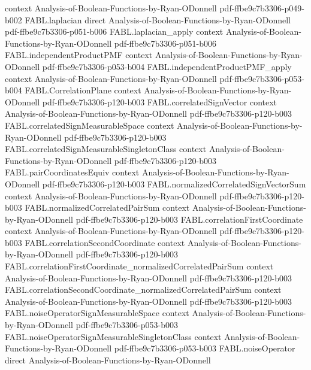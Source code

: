 \begin{theorem}
  {context}
  {Analysis-of-Boolean-Functions-by-Ryan-ODonnell}
  {pdf-ffbe9c7b3306-p049-b002}
\proofstep
  {FABL.laplacian}
  {direct}
  {Analysis-of-Boolean-Functions-by-Ryan-ODonnell}
  {pdf-ffbe9c7b3306-p051-b006}
\proofstep
  {FABL.laplacian_apply}
  {context}
  {Analysis-of-Boolean-Functions-by-Ryan-ODonnell}
  {pdf-ffbe9c7b3306-p051-b006}
\proofstep
  {FABL.independentProductPMF}
  {context}
  {Analysis-of-Boolean-Functions-by-Ryan-ODonnell}
  {pdf-ffbe9c7b3306-p053-b004}
\proofstep
  {FABL.independentProductPMF_apply}
  {context}
  {Analysis-of-Boolean-Functions-by-Ryan-ODonnell}
  {pdf-ffbe9c7b3306-p053-b004}
\proofstep
  {FABL.CorrelationPlane}
  {context}
  {Analysis-of-Boolean-Functions-by-Ryan-ODonnell}
  {pdf-ffbe9c7b3306-p120-b003}
\proofstep
  {FABL.correlatedSignVector}
  {context}
  {Analysis-of-Boolean-Functions-by-Ryan-ODonnell}
  {pdf-ffbe9c7b3306-p120-b003}
\proofstep
  {FABL.correlatedSignMeasurableSpace}
  {context}
  {Analysis-of-Boolean-Functions-by-Ryan-ODonnell}
  {pdf-ffbe9c7b3306-p120-b003}
\proofstep
  {FABL.correlatedSignMeasurableSingletonClass}
  {context}
  {Analysis-of-Boolean-Functions-by-Ryan-ODonnell}
  {pdf-ffbe9c7b3306-p120-b003}
\proofstep
  {FABL.pairCoordinatesEquiv}
  {context}
  {Analysis-of-Boolean-Functions-by-Ryan-ODonnell}
  {pdf-ffbe9c7b3306-p120-b003}
\proofstep
  {FABL.normalizedCorrelatedSignVectorSum}
  {context}
  {Analysis-of-Boolean-Functions-by-Ryan-ODonnell}
  {pdf-ffbe9c7b3306-p120-b003}
\proofstep
  {FABL.normalizedCorrelatedPairSum}
  {context}
  {Analysis-of-Boolean-Functions-by-Ryan-ODonnell}
  {pdf-ffbe9c7b3306-p120-b003}
\proofstep
  {FABL.correlationFirstCoordinate}
  {context}
  {Analysis-of-Boolean-Functions-by-Ryan-ODonnell}
  {pdf-ffbe9c7b3306-p120-b003}
\proofstep
  {FABL.correlationSecondCoordinate}
  {context}
  {Analysis-of-Boolean-Functions-by-Ryan-ODonnell}
  {pdf-ffbe9c7b3306-p120-b003}
\proofstep
  {FABL.correlationFirstCoordinate_normalizedCorrelatedPairSum}
  {context}
  {Analysis-of-Boolean-Functions-by-Ryan-ODonnell}
  {pdf-ffbe9c7b3306-p120-b003}
\proofstep
  {FABL.correlationSecondCoordinate_normalizedCorrelatedPairSum}
  {context}
  {Analysis-of-Boolean-Functions-by-Ryan-ODonnell}
  {pdf-ffbe9c7b3306-p120-b003}
\proofstep
  {FABL.noiseOperatorSignMeasurableSpace}
  {context}
  {Analysis-of-Boolean-Functions-by-Ryan-ODonnell}
  {pdf-ffbe9c7b3306-p053-b003}
\proofstep
  {FABL.noiseOperatorSignMeasurableSingletonClass}
  {context}
  {Analysis-of-Boolean-Functions-by-Ryan-ODonnell}
  {pdf-ffbe9c7b3306-p053-b003}
\proofstep
  {FABL.noiseOperator}
  {direct}
  {Analysis-of-Boolean-Functions-by-Ryan-ODonnell}

\end{theorem}
